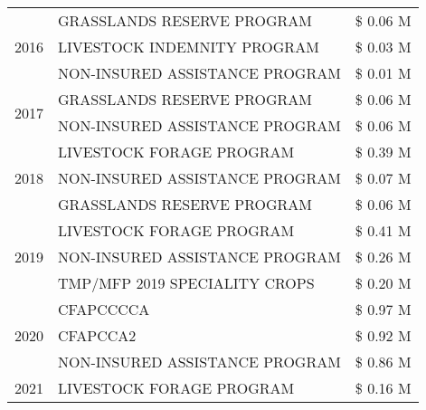 \begin{tabular}{llr}
\cline{1-3}
\multirow[t]{3}{*}{2016} & GRASSLANDS RESERVE PROGRAM & \$ 0.06 M \\
 & LIVESTOCK INDEMNITY PROGRAM & \$ 0.03 M \\
 & NON-INSURED ASSISTANCE PROGRAM & \$ 0.01 M \\
\cline{1-3}
\multirow[t]{2}{*}{2017} & GRASSLANDS RESERVE PROGRAM & \$ 0.06 M \\
 & NON-INSURED ASSISTANCE PROGRAM & \$ 0.06 M \\
\cline{1-3}
\multirow[t]{3}{*}{2018} & LIVESTOCK FORAGE PROGRAM & \$ 0.39 M \\
 & NON-INSURED ASSISTANCE PROGRAM & \$ 0.07 M \\
 & GRASSLANDS RESERVE PROGRAM & \$ 0.06 M \\
\cline{1-3}
\multirow[t]{3}{*}{2019} & LIVESTOCK FORAGE PROGRAM & \$ 0.41 M \\
 & NON-INSURED ASSISTANCE PROGRAM & \$ 0.26 M \\
 & TMP/MFP 2019 SPECIALITY CROPS & \$ 0.20 M \\
\cline{1-3}
\multirow[t]{3}{*}{2020} & CFAPCCCCA & \$ 0.97 M \\
 & CFAPCCA2 & \$ 0.92 M \\
 & NON-INSURED ASSISTANCE PROGRAM & \$ 0.86 M \\
\cline{1-3}
2021 & LIVESTOCK FORAGE PROGRAM & \$ 0.16 M \\
\cline{1-3}
\bottomrule
\end{tabular}
